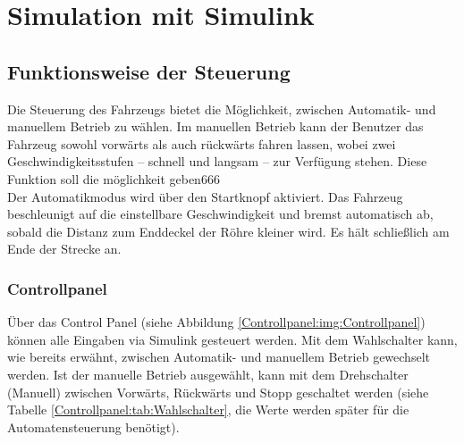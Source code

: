 \newpage






\newpage
\section{Simulation mit Simulink}
\label{section:Simulation}



\subsection{Funktionsweise der Steuerung}
\label{Steuerung}


Die Steuerung des Fahrzeugs bietet die Möglichkeit, zwischen Automatik- und manuellem Betrieb zu wählen. Im manuellen Betrieb kann der Benutzer das Fahrzeug sowohl vorwärts als auch rückwärts fahren lassen, wobei zwei Geschwindigkeitsstufen – schnell und langsam – zur Verfügung stehen. Diese Funktion soll die möglichkeit geben666\\
Der Automatikmodus wird über den Startknopf aktiviert. Das Fahrzeug beschleunigt auf die einstellbare Geschwindigkeit und bremst automatisch ab, sobald die Distanz zum Enddeckel der Röhre kleiner wird. Es hält schließlich am Ende der Strecke an.\\

\subsubsection{Controllpanel}
\label{Steuerung:Controllpanel}
Über das Control Panel (siehe Abbildung \ref{Controllpanel:img:Controllpanel}) können alle Eingaben via Simulink gesteuert werden. Mit dem Wahlschalter kann, wie bereits erwähnt, zwischen Automatik- und manuellem Betrieb gewechselt werden. Ist der manuelle Betrieb ausgewählt, kann mit dem Drehschalter (Manuell) zwischen Vorwärts, Rückwärts und Stopp geschaltet werden (siehe Tabelle \ref{Controllpanel:tab:Wahlschalter}, die Werte werden später für die Automatensteuerung benötigt).\\


